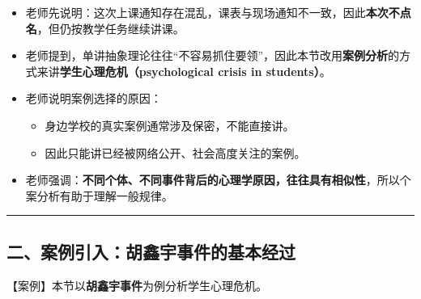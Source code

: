 \documentclass[
  chinese,
  9pt,
  a4paper,
]{ctexart}
\providecommand{\tightlist}{%
  \setlength{\itemsep}{0pt}\setlength{\parskip}{0pt}}
\begin{document}
\begin{itemize}
\item
  老师先说明：这次上课通知存在混乱，课表与现场通知不一致，因此\textbf{本次不点名}，但仍按教学任务继续讲课。
\item
  老师提到，单讲抽象理论往往``不容易抓住要领''，因此本节改用\textbf{案例分析}的方式来讲\textbf{学生心理危机（psychological
  crisis in students）}。
\item
  老师说明案例选择的原因：

  \begin{itemize}
  \tightlist
  \item
    身边学校的真实案例通常涉及保密，不能直接讲。
  \item
    因此只能讲已经被网络公开、社会高度关注的案例。
  \end{itemize}
\item
  老师强调：\textbf{不同个体、不同事件背后的心理学原因，往往具有相似性}，所以个案分析有助于理解一般规律。
\end{itemize}

\begin{center}\rule{0.5\linewidth}{0.5pt}\end{center}

\subsection{二、案例引入：胡鑫宇事件的基本经过}\label{ux4e8cux6848ux4f8bux5f15ux5165ux80e1ux946bux5b87ux4e8bux4ef6ux7684ux57faux672cux7ecfux8fc7}

【案例】本节以\textbf{胡鑫宇事件}为例分析学生心理危机。
\end{document}
